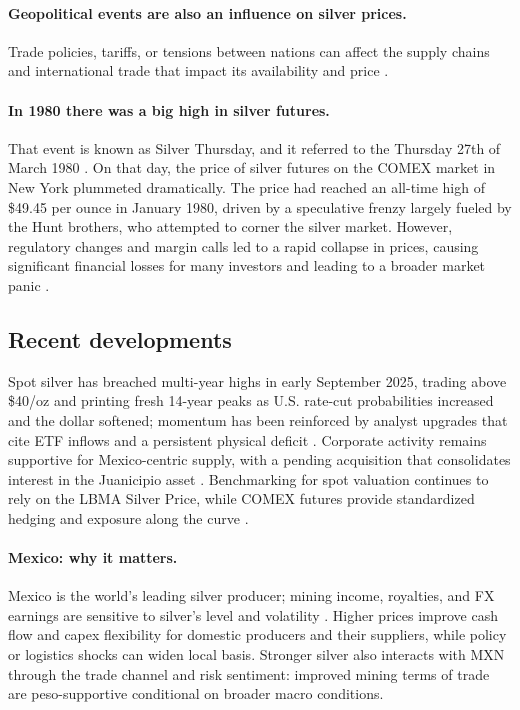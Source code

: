 \documentclass[10pt,a4paper]{article} %
\begin{document}
\paragraph{Geopolitical events are also an influence on silver prices.} Trade policies, tariffs, or tensions between nations can affect the supply chains and international trade that impact its availability and price \citep{silver_institute_wss_2024}.

\paragraph{In 1980 there was a big high in silver futures.} That event is known as Silver Thursday, and it referred to the Thursday 27th of March 1980 \citep{britannica_silver_thursday,nyt_1980_silver_thursday}.
On that day, the price of silver futures on the COMEX market in New York plummeted dramatically. The price had reached an all-time high of \$49.45 per ounce in January 1980, driven by a speculative frenzy largely fueled by the Hunt brothers, who attempted to corner the silver market. However, regulatory changes and margin calls led to a rapid collapse in prices, causing significant financial losses for many investors and leading to a broader market panic \citep{britannica_silver_thursday,nyt_1980_silver_thursday}.

\subsection{Recent developments}
Spot silver has breached multi-year highs in early September 2025, trading above \$40/oz and printing fresh 14-year peaks as U.S. rate-cut probabilities increased and the dollar softened; momentum has been reinforced by analyst upgrades that cite ETF inflows and a persistent physical deficit \citep{reuters_silver_14y_sep1,reuters_tradingday_sep11,reuters_anz_raises_silver,lbma_q2_2025}. Corporate activity remains supportive for Mexico-centric supply, with a pending acquisition that consolidates interest in the Juanicipio asset \citep{reuters_paasmag}. Benchmarking for spot valuation continues to rely on the LBMA Silver Price, while COMEX futures provide standardized hedging and exposure along the curve \citep{lbma_prices,cme_silver_overview}.

\paragraph{Mexico: why it matters.}
Mexico is the world’s leading silver producer; mining income, royalties, and FX earnings are sensitive to silver’s level and volatility \citep{reuters_mx_top_silver}. Higher prices improve cash flow and capex flexibility for domestic producers and their suppliers, while policy or logistics shocks can widen local basis. Stronger silver also interacts with MXN through the trade channel and risk sentiment: improved mining terms of trade are peso-supportive conditional on broader macro conditions.
\end{document}
